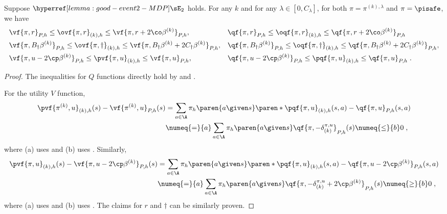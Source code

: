\begin{lemma}\label{lemma:opt-pes-MDP}
Suppose $\confevent$ holds. 
For any $k$ and for any $\lambda \in [0, C_\lambda]$, for both $\pi = \pi^{(k), \lambda}$ and $\pi=\pisafe$, we have 
\begin{align*}
&\vf{\pi,r}_{P, h} \leq \ovf{\pi,r}_{(k), h} \leq  \vf{\pi,r+ 2\co \beta^{(k)}}_{P, h},
&&\qf{\pi,r}_{P, h} \leq \oqf{\pi,r}_{(k), h} \leq  \qf{\pi,r+ 2\co \beta^{(k)}}_{P, h}  \\
&\vf{\pi,B_\dagger\beta^{(k)}}_{P, h} \leq \ovf{\pi,\dagger}_{(k), h} \leq  \vf{\pi,B_\dagger\beta^{(k)} + 2C_\dagger \beta^{(k)}}_{P, h},
&&\qf{\pi,B_\dagger\beta^{(k)}}_{P, h} \leq \oqf{\pi,\dagger}_{(k), h} \leq  \qf{\pi,B_\dagger\beta^{(k)} + 2C_\dagger \beta^{(k)}}_{P, h},\\
&\vf{\pi,u-2\cp \beta^{(k)}}_{P, h} \leq \pvf{\pi,u}_{(k), h} \leq \vf{\pi,u}_{P, h},
&&\qf{\pi,u-2\cp \beta^{(k)}}_{P, h} \leq \pqf{\pi,u}_{(k), h} \leq \qf{\pi,u}_{P, h}\;.
\end{align*}
\end{lemma}
\begin{proof}
The inequalities for $Q$ functions directly hold by  and .

For the utility $V$ function,
\begin{align*}
\pvf{\pi^{(k)},u}_{(k), h}(s) - \vf{\pi^{(k)},u}_{P, h}(s)
&= 
\sum_{a \in \A} \pi_h\paren{a \given s}
\paren*{
\pqf{\pi,u}_{(k), h}(s, a) - \qf{\pi,u}_{P, h}(s, a)
}\\
&\numeq{=}{a} 
\sum_{a \in \A} \pi_h\paren{a \given s} \qf{\pi, -\delta^{\pi, u}_{(k)}}_{P, h}(s)\numeq{\leq}{b} 0\;,
\end{align*}
where (a) uses  and (b) uses .
Similarly,
\begin{align*}
\pvf{\pi,u}_{(k), h}(s) - \vf{\pi,u - 2\cp \beta^{(k)}}_{P, h}(s)
&= 
\sum_{a \in \A} \pi_h\paren{a \given s}
\paren*{
\pqf{\pi,u}_{(k), h}(s, a) - \qf{\pi,u-2\cp \beta^{(k)}}_{P, h}(s, a)
}\\
&\numeq{=}{a} 
\sum_{a \in \A} \pi_h\paren{a \given s} \qf{\pi, -\delta^{\pi, u}_{(k)} + 2\cp \beta^{(k)}}_{P, h}(s)\numeq{\geq}{b} 0\;,
\end{align*}
where (a) uses  and (b) uses .
The claims for $r$ and $\dagger$ can be similarly proven.
\end{proof}


